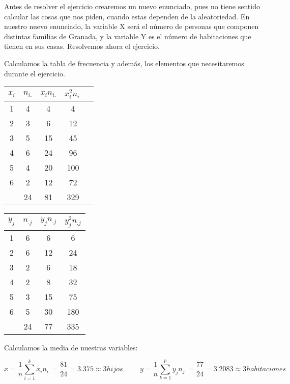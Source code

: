 Antes de resolver el ejercicio crearemos un nuevo enunciado, pues no tiene sentido calcular las cosas que nos piden, cuando estas dependen de la aleatoriedad. En nuestro nuevo enunciado, la variable X será el número de personas que componen distintas familias de Granada, y la variable Y es el número de habitaciones que tienen en sus casas. Resolvemos ahora el ejercicio.

\subproblem
Calculamos la tabla de frecuencia y además, los elementos que necesitaremos durante el ejercicio.

\begin{table}[h]
    \centering
    \begin{tabular}{|c|c|c|c|c|}
        \hline
         $x_i$ & $n_{i.}$ & $x_{i}n_{i.}$ & $x_i^2 n_{i.}$ \\ \hline
         1 & 4 & 4 & 4 \\ \hline 
         2 & 3 & 6 & 12 \\ \hline 
         3 & 5 & 15 & 45\\ \hline 
         4 & 6 & 24 & 96 \\ \hline 
         5 & 4 & 20 & 100 \\ \hline 
         6 & 2 & 12 & 72 \\ \hline 
          & 24 & 81 & 329 \\ \hline 
    \end{tabular}
\end{table}

\begin{table}[h]
    \centering
    \begin{tabular}{|c|c|c|c|}
        \hline
         $y_j$ & $n_{.j}$ & $y_{j}n_{.j}$ & $y_{j}^2n_{.j}$ \\ \hline
         1 & 6 & 6 & 6 \\ \hline 
         2 & 6 & 12 & 24 \\ \hline 
         3 & 2 & 6 & 18 \\ \hline 
         4 & 2 & 8 & 32 \\ \hline 
         5 & 3 & 15 & 75 \\ \hline 
         6 & 5 & 30 & 180 \\ \hline
           & 24 & 77 & 335 \\ \hline 
    \end{tabular}
\end{table}

\subproblem
Calculamos la media de nuestras variables:

\begin{equation*}
    \overline{x} = \dfrac{1}{n} \sum_{i=1}^k x_i n_{i.} = \dfrac{81}{24} = 3.375 \approx 3 hijos
    \hspace{1cm}
    \overline{y} = \dfrac{1}{n} \sum_{k=1}^p y_j n_{j.} = \dfrac{77}{24} = 3.2083 \approx 3 habitaciones
\end{equation*}

